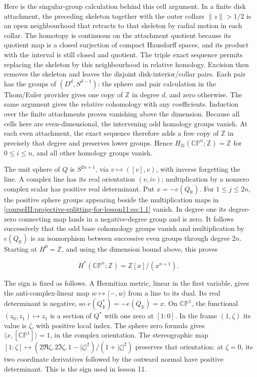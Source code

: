 Here is the singular-group calculation behind this cell argument. In a finite disk attachment, the preceding skeleton together with the outer collars \(\|z\|>1/2\) is an open neighbourhood that retracts to that skeleton by radial motion in each collar. The homotopy is continuous on the attachment quotient because its quotient map is a closed surjection of compact Hausdorff spaces, and its product with the interval is still closed and quotient. The triple exact sequence permits replacing the skeleton by this neighbourhood in relative homology. Excision then removes the skeleton and leaves the disjoint disk-interior/collar pairs. Each pair has the groups of \((D^d,S^{d-1})\): the sphere and pair calculation in the Thom/Euler provider gives one copy of \(\mathbb Z\) in degree \(d\), and zero otherwise. The same argument gives the relative cohomology with any coefficients. Induction over the finite attachments proves vanishing above the dimension. Because all cells here are even-dimensional, the intervening odd homology groups vanish. At each even attachment, the exact sequence therefore adds a free copy of \(\mathbb Z\) in precisely that degree and preserves lower groups. Hence \(H_{2i}(\mathbb{CP}^n;\mathbb Z)=\mathbb Z\) for \(0\le i\le n\), and all other homology groups vanish.

The unit sphere of \(Q\) is \(S^{2n+1}\), via \(v\mapsto([v],v)\), with inverse forgetting the line. A complex line has its real orientation \((v,iv)\); multiplication by a nonzero complex scalar has positive real determinant. Put \(x=-e(Q_{\mathbb R})\). For \(1\le j\le2n\), the positive sphere groups appearing beside the multiplication maps in \eqref{courseIII:projective-splitting-for-lesson11:eq:1.1} vanish. In degree one its degree-zero connecting map lands in a negative-degree group and is zero. It follows successively that the odd base cohomology groups vanish and multiplication by \(e(Q_{\mathbb R})\) is an isomorphism between successive even groups through degree \(2n\). Starting at \(H^0=\mathbb Z\), and using the dimension bound above, this proves

\begin{equation}
H^*(\mathbb{CP}^n;\mathbb Z)=\mathbb Z[x]/(x^{n+1}).
\label{courseIII:projective-splitting-for-lesson11:eq:2.2}
\end{equation}

The sign is fixed as follows. A Hermitian metric, linear in the first variable, gives the anti-complex-linear map \(w\mapsto\langle -,w\rangle\) from a line to its dual. Its real determinant is negative, so \(e(Q^*_{\mathbb R})=-e(Q_{\mathbb R})=x\). On \(\mathbb{CP}^1\), the functional \((z_0,z_1)\mapsto z_1\) is a section of \(Q^*\) with one zero at \([1:0]\). In the frame \((1,\zeta)\) its value is \(\zeta\), with positive local index. The sphere zero formula gives \(\langle x,[\mathbb{CP}^1]\rangle=1\), in the complex orientation. The stereographic map \([1:\zeta]\mapsto(2\Re\zeta,2\Im\zeta,1-|\zeta|^2)/(1+|\zeta|^2)\) preserves that orientation: at \(\zeta=0\), its two coordinate derivatives followed by the outward normal have positive determinant. This is the sign used in lesson 11.

